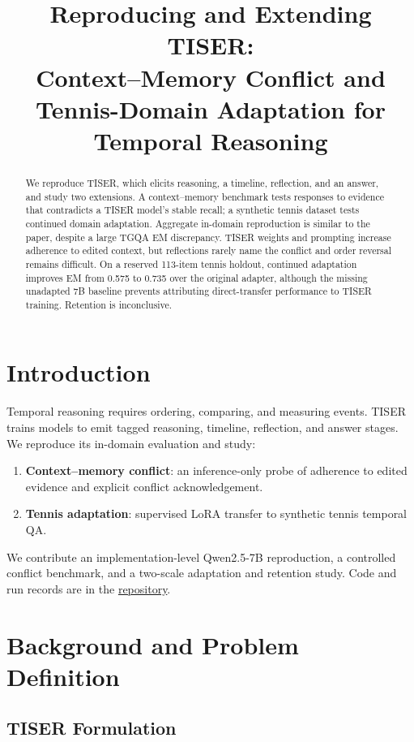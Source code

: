 \documentclass[conference]{IEEEtran}
\title{Reproducing and Extending TISER:\\
Context--Memory Conflict and Tennis-Domain Adaptation for Temporal Reasoning}
\author{
\IEEEauthorblockN{
Gabriele Adorni s349308,
Alessandro Casadei s349386, \\
Taha Atabay Cetin s349501
}
\IEEEauthorblockA{
Politecnico di Torino\\
Deep Natural Language Processing
}
}
\begin{document}
\maketitle

\begin{abstract}
We reproduce TISER, which elicits reasoning, a timeline, reflection, and an answer, and study two extensions. A context--memory benchmark tests responses to evidence that contradicts a TISER model's stable recall; a synthetic tennis dataset tests continued domain adaptation. Aggregate in-domain reproduction is similar to the paper, despite a large TGQA EM discrepancy. TISER weights and prompting increase adherence to edited context, but reflections rarely name the conflict and order reversal remains difficult. On a reserved 113-item tennis holdout, continued adaptation improves EM from 0.575 to 0.735 over the original adapter, although the missing unadapted 7B baseline prevents attributing direct-transfer performance to TISER training. Retention is inconclusive.
\end{abstract}

\section{Introduction}

Temporal reasoning requires ordering, comparing, and measuring events. TISER~\cite{bazaga2025tiser} trains models to emit tagged reasoning, timeline, reflection, and answer stages. We reproduce its in-domain evaluation and study:
\begin{enumerate}
\item \textbf{Context--memory conflict}: an inference-only probe of adherence to edited evidence and explicit conflict acknowledgement.
\item \textbf{Tennis adaptation}: supervised LoRA transfer to synthetic tennis temporal QA.
\end{enumerate}
We contribute an implementation-level Qwen2.5-7B reproduction, a controlled conflict benchmark, and a two-scale adaptation and retention study. Code and run records are in the \href{https://github.com/thestbobo/tiser_temporal_reasoning_extension}{repository}.

\section{Background and Problem Definition}

\subsection{TISER Formulation}
\end{document}
